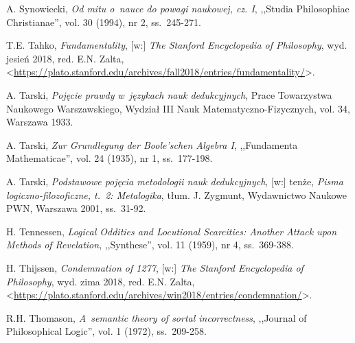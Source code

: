 \begin{thebibliography}{100}

A. Synowiecki, \textit{Od mitu o~nauce do powagi naukowej, cz. I}, ,,Studia Philosophiae Christianae'', vol. 30 (1994), nr 2, ss.~245-271.

T.E. Tahko, \textit{Fundamentality}, [w:] \textit{The Stanford Encyclopedia of Philosophy},
wyd. jesień 2018, red. E.N. Zalta, {\textless}\url{https://plato.stanford.edu/archives/fall2018/entries/fundamentality/}{\textgreater}.

A. Tarski, \textit{Pojęcie prawdy w~językach nauk dedukcyjnych}, Prace Towarzystwa Naukowego Warszawskiego, Wydział III Nauk Matematyczno-Fizycznych, vol. 34, Warszawa 1933.

A. Tarski, \textit{Zur Grundlegung der Boole'schen Algebra I}, ,,Fundamenta Mathematicae'', vol. 24 (1935), nr 1, ss.~177-198.

A. Tarski, \textit{Podstawowe pojęcia metodologii nauk dedukcyjnych}, [w:] tenże, \textit{Pisma logiczno-filozoficzne, t.~2: Metalogika},
tłum. J. Zygmunt, Wydawnictwo Naukowe PWN, Warszawa 2001, ss.~31-92.



H. Tennessen, \textit{Logical Oddities and Locutional Scarcities: Another Attack upon Methods of Revelation}, ,,Synthese'', vol. 11 (1959), nr 4, ss.~369-388.

H. Thijssen, \textit{Condemnation of 1277}, [w:] \textit{The Stanford Encyclopedia of Philosophy},
wyd. zima 2018, red. E.N. Zalta, {\textless}\url{https://plato.stanford.edu/archives/win2018/entries/condemnation/}{\textgreater}.

R.H. Thomason, \textit{A~semantic theory of sortal incorrectness}, ,,Journal of Philosophical Logic'', vol. 1 (1972), ss.~209-258.



\end{thebibliography}
